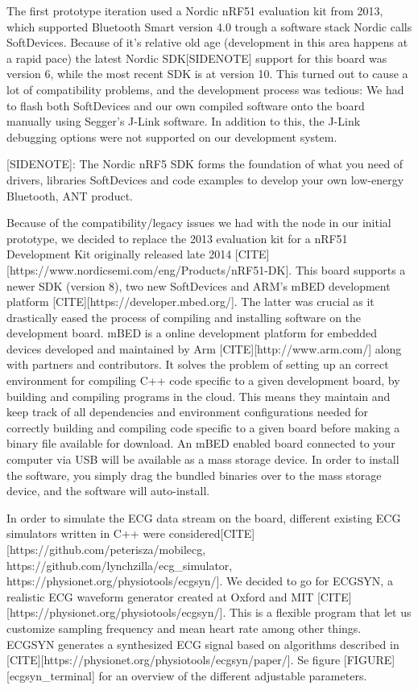 The first prototype iteration used a Nordic nRF51 evaluation kit from 2013, which supported Bluetooth Smart version 4.0 trough a software stack Nordic calls SoftDevices. Because of it's relative old age (development in this area happens at a rapid pace) the latest Nordic SDK[SIDENOTE] support for this board was version 6, while the most recent SDK is at version 10. This turned out to cause a lot of compatibility problems, and the development process was tedious: We had to flash both SoftDevices and our own compiled software onto the board manually using Segger's J-Link software. In addition to this, the J-Link debugging options were not supported on our development system.

[SIDENOTE]: The Nordic nRF5 SDK forms the foundation of what you need of drivers, libraries SoftDevices and code examples to develop your own low-energy Bluetooth, ANT product.

Because of the compatibility/legacy issues we had with the node in our initial prototype, we decided to replace the 2013 evaluation kit for a nRF51 Development Kit originally released late 2014 [CITE][https://www.nordicsemi.com/eng/Products/nRF51-DK]. This board supports a newer SDK (version 8), two new SoftDevices and ARM's mBED development platform [CITE][https://developer.mbed.org/]. The latter was crucial as it drastically eased the process of compiling and installing software on the development board. mBED is a online development platform for embedded devices developed and maintained by Arm [CITE][http://www.arm.com/] along with partners and contributors. It solves the problem of setting up an correct environment for compiling C++ code specific to a given development board, by building and compiling programs in the cloud. This means they maintain and keep track of all dependencies and environment configurations needed for correctly building and compiling code specific to a given board before making a binary file available for download. An mBED enabled board connected to your computer via USB will be available as a mass storage device. In order to install the software, you simply drag the bundled binaries over to the mass storage device, and the software will auto-install. 

In order to simulate the ECG data stream on the board, different existing ECG simulators written in C++ were considered[CITE][https://github.com/peterisza/mobilecg, https://github.com/lynchzilla/ecg_simulator, https://physionet.org/physiotools/ecgsyn/]. We decided to go for ECGSYN, a realistic ECG waveform generator created at Oxford and MIT [CITE][https://physionet.org/physiotools/ecgsyn/]. This is a flexible program that let us customize sampling frequency and mean heart rate among other things. ECGSYN generates a synthesized ECG signal based on algorithms described in [CITE][https://physionet.org/physiotools/ecgsyn/paper/]. Se figure [FIGURE][ecgsyn_terminal] for an overview of the different adjustable parameters.


